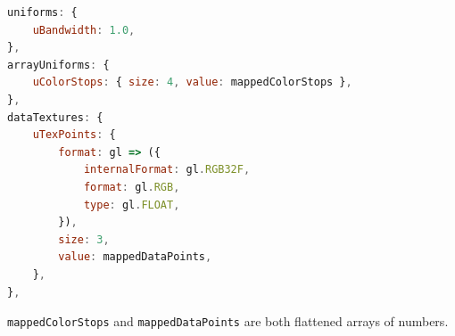 \begin{lstlisting}[language=JavaScript,caption=Passing Data to the Shader]
uniforms: {
    uBandwidth: 1.0,
},
arrayUniforms: {
    uColorStops: { size: 4, value: mappedColorStops },
},
dataTextures: {
    uTexPoints: {
        format: gl => ({
            internalFormat: gl.RGB32F,
            format: gl.RGB,
            type: gl.FLOAT,
        }),
        size: 3,
        value: mappedDataPoints,
    },
},
\end{lstlisting}

\verb|mappedColorStops| and \verb|mappedDataPoints| are both flattened arrays of numbers.